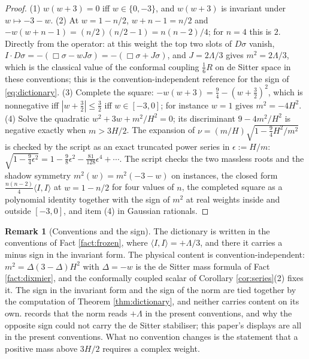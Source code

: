 \documentclass[11pt]{article}
\theoremstyle{definition}
\newtheorem{remark}[theorem]{Remark}
\newcommand{\ip}[2]{\langle #1, #2\rangle}
\begin{document}
\begin{proof}
(1) $w(w+3) = 0$ iff $w \in \{0,-3\}$, and $w(w+3)$ is invariant under $w \mapsto -3-w$. (2) At $w = 1 - n/2$, $w + n - 1 = n/2$ and $-w(w+n-1) = (n/2)(n/2 - 1) = n(n-2)/4$; for $n = 4$ this is $2$. Directly from the operator: at this weight the top two slots of $D\sigma$ vanish, $I \cdot D\sigma = -(\Box\sigma - wJ\sigma) = -(\Box\sigma + J\sigma)$, and $J = 2\Lambda/3$ gives $m^{2} = 2\Lambda/3$, which is the classical value of the conformal coupling $\tfrac16 R$ on de Sitter space in these conventions; this is the convention-independent reference for the sign of \eqref{eq:dictionary}. (3) Complete the square: $-w(w+3) = \tfrac94 - (w+\tfrac32)^{2}$, which is nonnegative iff $|w + \tfrac32| \le \tfrac32$ iff $w \in [-3,0]$; for instance $w = 1$ gives $m^{2} = -4H^{2}$. (4) Solve the quadratic $w^{2} + 3w + m^{2}/H^{2} = 0$; its discriminant $9 - 4m^{2}/H^{2}$ is negative exactly when $m > 3H/2$. The expansion of $\nu = (m/H)\sqrt{1 - \tfrac94 H^{2}/m^{2}}$ is checked by the script as an exact truncated power series in $\epsilon := H/m$: $\sqrt{1 - \tfrac94\epsilon^{2}} = 1 - \tfrac98\epsilon^{2} - \tfrac{81}{128}\epsilon^{4} + \cdots$. The script checks the two massless roots and the shadow symmetry $m^{2}(w) = m^{2}(-3-w)$ on instances, the closed form $\tfrac{n(n-2)}{4}\ip{I}{I}$ at $w = 1 - n/2$ for four values of $n$, the completed square as a polynomial identity together with the sign of $m^{2}$ at real weights inside and outside $[-3,0]$, and item (4) in Gaussian rationals.
\end{proof}

\begin{remark}[Conventions and the sign]\label{rem:sign}
The dictionary is written in the conventions of Fact \ref{fact:frozen}, where $\ip{I}{I} = +\Lambda/3$, and there it carries a minus sign in the invariant form. The physical content is convention-independent: $m^{2} = \Delta(3-\Delta)H^{2}$ with $\Delta = -w$ is the de Sitter mass formula of Fact \ref{fact:dixmier}, and the conformally coupled scalar of Corollary \ref{cor:series}(2) fixes it. The sign in the invariant form and the sign of the norm are tied together by the computation of Theorem \ref{thm:dictionary}, and neither carries content on its own. \cite[Rem.~4.9]{ButlerT6} records that the norm reads $+\Lambda$ in the present conventions, and why the opposite sign could not carry the de Sitter stabiliser; this paper's displays are all in the present conventions. What no convention changes is the statement that a positive mass above $3H/2$ requires a complex weight.
\end{remark}
\end{document}
